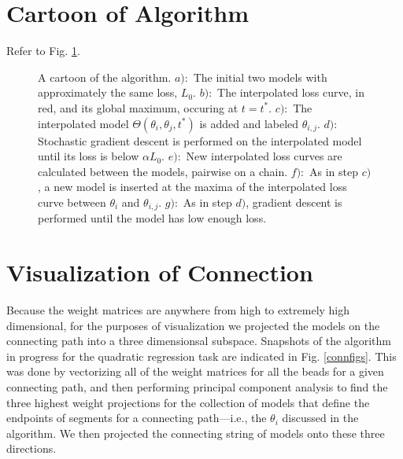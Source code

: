 \section{Cartoon of Algorithm}
\label{AlgCartoon}

Refer to Fig. \ref{fig:cartoon}.

\begin{figure}
\begin{center}
\end{center}
\caption{A cartoon of the algorithm.  $a):$ The initial two models with approximately the same loss, $L_0$. $b):$ The interpolated loss curve, in red, and its global maximum, occuring at $t=t^*$. $c):$ The interpolated model $\Theta(\theta_i, \theta_j, t^*)$ is added and labeled $\theta_{i,j}$.  $d):$ Stochastic gradient descent is performed on the interpolated model until its loss is below $\alpha L_0$. $e):$ New interpolated loss curves are calculated between the models, pairwise on a chain.  $f):$ As in step $c)$, a new model is inserted at the maxima of the interpolated loss curve between $\theta_i$ and $\theta_{i,j}$.  $g):$  As in step $d)$, gradient descent is performed until the model has low enough loss.}
\label{fig:cartoon}
\end{figure}


\section{Visualization of Connection}
\label{visualization}

 Because the weight matrices are anywhere from high to extremely high dimensional, for the purposes of visualization we projected the models on the connecting path into a three dimensionsal subspace.  Snapshots of the algorithm in progress for the quadratic regression task are indicated in Fig. \ref{connfigs}.  This was done by vectorizing all of the weight matrices for all the beads for a given connecting path, and then performing principal component analysis to find the three highest weight projections for the collection of models that define the endpoints of segments for a connecting path---i.e., the $\theta_i$ discussed in the algorithm.  We then projected the connecting string of models onto these three directions.  
 
